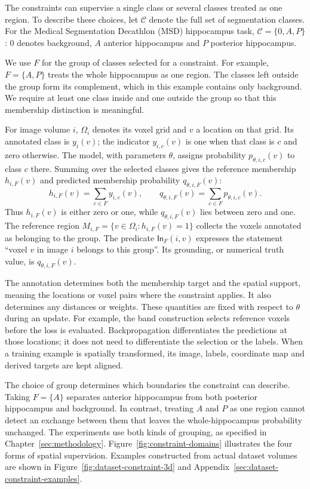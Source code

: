 \documentclass[12pt,a4paper]{article}
\begin{document}
The constraints can supervise a single class or several classes treated
as one region. To describe these choices, let $\mathcal C$ denote the full
set of segmentation classes. For the Medical Segmentation Decathlon (MSD)
hippocampus task, $\mathcal C=\{0,A,P\}$: $0$ denotes background,
$A$ anterior hippocampus and $P$ posterior hippocampus.

We use $F$ for the group of classes selected for a constraint. For example,
$F=\{A,P\}$ treats the whole hippocampus as one region. The classes left
outside the group form its complement, which in this example contains
only background. We require at least one class inside and one outside
the group so that this membership distinction is meaningful.

For image volume $i$, $\Omega_i$ denotes its voxel grid and $v$ a location
on that grid. Its annotated class is $y_i(v)$; the indicator $y_{i,c}(v)$
is one when that class is $c$ and zero otherwise. The model, with parameters
$\theta$, assigns probability $p_{\theta,i,c}(v)$ to class $c$ there.
Summing over the selected classes gives the reference membership
$h_{i,F}(v)$ and predicted membership probability $q_{\theta,i,F}(v)$:
\begin{equation}
h_{i,F}(v)=\sum_{c\in F}y_{i,c}(v),
\qquad
q_{\theta,i,F}(v)=\sum_{c\in F}p_{\theta,i,c}(v).
\label{eq:constraint-group-membership}
\end{equation}
Thus $h_{i,F}(v)$ is either zero or one, while $q_{\theta,i,F}(v)$ lies
between zero and one. The reference region
$M_{i,F}=\{v\in\Omega_i:h_{i,F}(v)=1\}$ collects the voxels annotated
as belonging to the group. The predicate $\mathsf{In}_F(i,v)$ expresses
the statement ``voxel $v$ in image $i$ belongs to this group''. Its
grounding, or numerical truth value, is $q_{\theta,i,F}(v)$.

The annotation determines both the membership target and the spatial
support, meaning the locations or voxel pairs where the constraint applies.
It also determines any distances or weights.
These quantities are fixed with respect to $\theta$ during an update.
For example, the band construction selects reference voxels before the
loss is evaluated. Backpropagation differentiates the predictions at those
locations; it does not need to differentiate the selection or the labels.
When a training example is spatially transformed, its image, labels,
coordinate map and derived targets are kept aligned.

The choice of group determines which boundaries the constraint can
describe. Taking $F=\{A\}$ separates anterior hippocampus from both
posterior hippocampus and background. In contrast, treating $A$ and $P$
as one region cannot detect an exchange between them that leaves the
whole-hippocampus probability unchanged. The experiments use both kinds
of grouping, as specified in Chapter~\ref{sec:methodology}.
Figure~\ref{fig:constraint-domains} illustrates the four forms of
spatial supervision. Examples constructed from actual dataset volumes are
shown in Figure~\ref{fig:dataset-constraint-3d} and
Appendix~\ref{sec:dataset-constraint-examples}.
\end{document}
